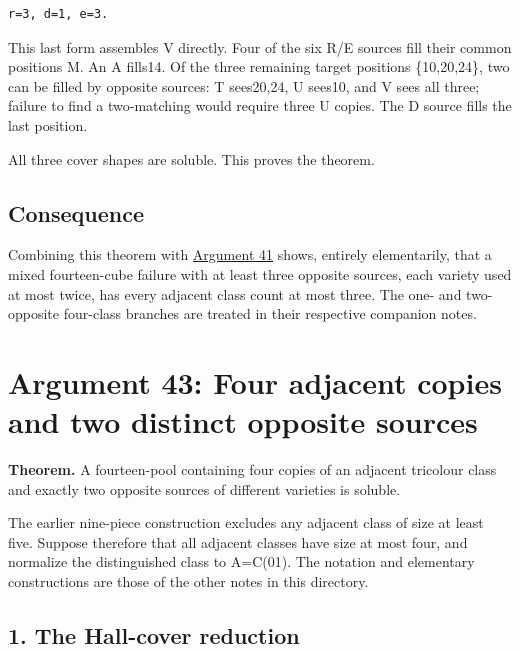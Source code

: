 \documentclass[
  10pt,
]{article}
\begin{document}
\begin{verbatim}
r=3, d=1, e=3.
\end{verbatim}

This last form assembles V directly. Four of the six R/E sources fill
their common positions M. An A fills14. Of the three remaining target
positions \{10,20,24\}, two can be filled by opposite sources: T
sees20,24, U sees10, and V sees all three; failure to find a
two-matching would require three U copies. The D source fills the last
position.

All three cover shapes are soluble. This proves the theorem.

\hypertarget{consequence-2}{%
\subsection*{Consequence}\label{consequence-2}}

Combining this theorem with \protect\hyperlink{arg-41}{Argument 41}
shows, entirely elementarily, that a mixed fourteen-cube failure with at
least three opposite sources, each variety used at most twice, has every
adjacent class count at most three. The one- and two-opposite four-class
branches are treated in their respective companion notes.

\hypertarget{arg-43}{%
\section{Argument 43: Four adjacent copies and two distinct opposite
sources}\label{arg-43}}

\textbf{Theorem.} A fourteen-pool containing four copies of an adjacent
tricolour class and exactly two opposite sources of different varieties
is soluble.

The earlier nine-piece construction excludes any adjacent class of size
at least five. Suppose therefore that all adjacent classes have size at
most four, and normalize the distinguished class to A=C(01). The
notation and elementary constructions are those of the other notes in
this directory.

\hypertarget{the-hall-cover-reduction}{%
\subsection*{1. The Hall-cover
reduction}\label{the-hall-cover-reduction}}
\end{document}
